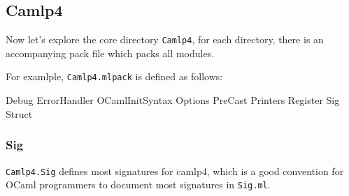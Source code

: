 \subsection{Camlp4}
Now let's explore the core directory \verb|Camlp4|, for each
directory, there is an accompanying pack file which packs all modules.

For examlple, \verb|Camlp4.mlpack| is defined as follows:

\begin{bashcode}
Debug
ErrorHandler
OCamlInitSyntax
Options
PreCast
Printers
Register
Sig
Struct
\end{bashcode}

\subsubsection{Sig}
\label{sec:sig}
\verb|Camlp4.Sig| defines most signatures for camlp4, which is a good
convention for OCaml programmers to document most signatures in
\verb|Sig.ml|.

